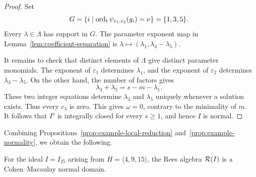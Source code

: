 \begin{proof}
Set
\[
 G=\{i\mid\operatorname{ord}_t\psi_{\varepsilon_1,\varepsilon_2}(g_i)=\nu\}=\{1,3,5\}.
\]
Every $\lambda\in\Lambda$ has support in $G$. The parameter exponent
map in Lemma~\ref{lem:coefficient-separation} is
$\lambda\mapsto(\lambda_1,\lambda_3-\lambda_5)$.

It remains to check that distinct elements of $\Lambda$ give distinct
parameter monomials.  The exponent of $\varepsilon_1$ determines $\lambda_1$,
and the exponent of $\varepsilon_2$ determines $\lambda_3-\lambda_5$.  On the other hand,
the number of factors gives
$$
 \lambda_3+\lambda_5=s-m-\lambda_1.
$$
These two integer equations determine $\lambda_3$ and $\lambda_5$ uniquely
whenever a solution exists.  Thus every $c_\lambda$ is zero.  This gives
$\omega=0$, contrary to the minimality of $m$.  It follows that $I^s$ is
integrally closed for every $s\geq1$, and hence $I$ is normal.
\end{proof}

Combining Propositions~\ref{prop:example-local-reduction}
and~\ref{prop:example-normality}, we obtain the following.

\begin{theorem}
\label{thm:example-rees}
For the ideal $I=I_{25}$ arising from $H=\langle4,9,15\rangle$, the Rees
algebra $\mathcal R(I)$ is a Cohen--Macaulay normal domain.
\end{theorem}
